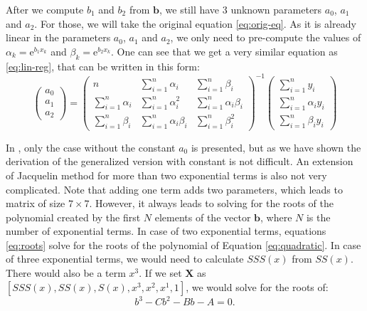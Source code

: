 After we compute $b_1$ and $b_2$ from $\boldsymbol{b}$, we still have 3 unknown parameters $a_0$, $a_1$ and $a_2$. For those, we will take the original equation \ref{eq:orig-eq}. As it is already linear in the parameters $a_0$, $a_1$ and $a_2$, we only need to pre-compute the values of $\alpha_k=\mathrm{e}^{b_1x_k}$ and $\beta_k =\mathrm{e}^{b_2x_k}$.
One can see that we get a very similar equation as \ref{eq:lin-reg}, that can be written in this form:
\begin{equation}
	\begin{pmatrix}
		a_0 \\
		a_1 \\
		a_2
	\end{pmatrix} 
	=
	\begin{pmatrix}
		n & \sum\limits_{i=1}^n\alpha_i & \sum\limits_{i=1}^n\beta_i  \\
		\sum\limits_{i=1}^n\alpha_i & \sum\limits_{i=1}^n\alpha_i^2 & \sum\limits_{i=1}^n\alpha_i\beta_i  \\
		\sum\limits_{i=1}^n\beta_i & \sum\limits_{i=1}^n\alpha_i\beta_i & \sum\limits_{i=1}^n\beta_i^2
	\end{pmatrix}^{-1}
	\begin{pmatrix}
		\sum\limits_{i=1}^ny_i \\
		\sum\limits_{i=1}^n\alpha_iy_i \\
		\sum\limits_{i=1}^n\beta_iy_i
	\end{pmatrix}
\end{equation}

In \cite{jacquelin2014}, only the case without the constant $a_0$ is presented, but as we have shown the derivation of the generalized version with constant is not difficult. An extension of Jacquelin method for more than two exponential terms is also not very complicated. Note that adding one term adds two parameters, which leads to matrix of size $7\times7$. However, it always leads to solving for the roots of the polynomial created by the first $N$ elements of the vector $\boldsymbol{b}$, where $N$ is the number of exponential terms. In case of two exponential terms, equations \ref{eq:roots} solve for the roots of the polynomial of Equation \ref{eq:quadratic}. In case of three exponential terms, we would need to calculate $SSS(x)$ from $SS(x)$. There would also be a term $x^3$. If we set $\boldsymbol{X}$ as $\left[SSS(x),SS(x),S(x),x^3,x^2,x^1,1\right]$, we would solve for the roots of:
\begin{equation}
	b^3-Cb^2-Bb-A=0.
\end{equation}

